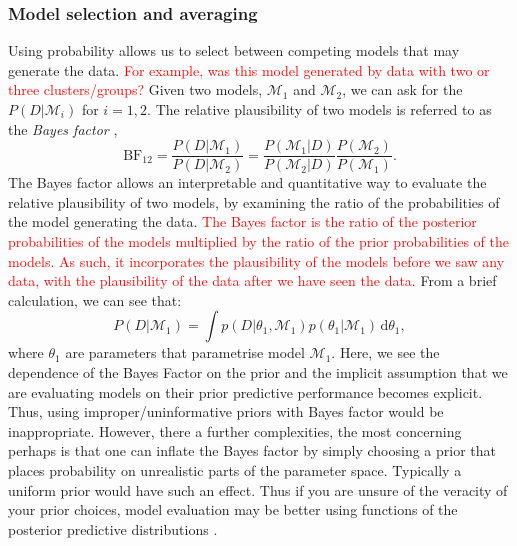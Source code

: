 \documentclass[12pt,english, journal=jpr, layout=twocolumn]{article}
\begin{document}
\subsubsection{Model selection and averaging}
Using probability allows us to select between competing models that may generate the data. \textcolor{red}{ For example, was this model generated by data with two or three clusters/groups?} Given two models, $\mathcal{M}_1$ and $\mathcal{M}_2$, we can ask for the $P(D| \mathcal{M}_i)$ for $i = 1,2$. The relative plausibility of two models is referred to as the \textit{Bayes factor} \citep{Kass::1995},
\begin{equation}
\text{BF}_{12} = \frac{P(D|\mathcal{M}_1)}{P(D|\mathcal{M}_2)} = \frac{P(\mathcal{M}_1|D)}{P(\mathcal{M}_2|D)}\frac{P(\mathcal{M}_2)}{P(\mathcal{M}_1)}. 
\end{equation}   
The Bayes factor allows an interpretable and quantitative way to evaluate the relative plausibility of two models, by examining the ratio of the probabilities of the model generating the data. \textcolor{red}{ The Bayes factor is the ratio of the posterior probabilities of the models multiplied by the ratio of the prior probabilities of the models. As such, it incorporates the plausibility of the models before we saw any data, with the plausibility of the data after we have seen the data}. From a brief calculation, we can see that:
\begin{equation}
P(D|\mathcal{M}_1) = \int p(D|\theta_1, \mathcal{M}_1)p(\theta_1|\mathcal{M}_1)\, \text{d}\theta_1,
\end{equation}   
where $\theta_1$ are parameters that parametrise model $\mathcal{M}_1$. Here, we see the dependence of the Bayes Factor on the prior and the implicit assumption that we are evaluating models on their prior predictive performance becomes explicit. Thus, using improper/uninformative priors with Bayes factor would be inappropriate. However, there a further complexities, the most concerning perhaps is that one can inflate the Bayes factor by simply choosing a prior that places probability on unrealistic parts of the parameter space. Typically a uniform prior would have such an effect. Thus if you are unsure of the veracity of your prior choices, model evaluation may be better using functions of the posterior predictive distributions \citep{Betancourt::2021}. 
\end{document}
